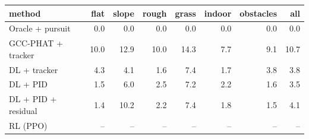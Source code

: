 \begin{tabular}{lrrrrrrr}
\toprule
method & flat & slope & rough & grass & indoor & obstacles & all\\
\midrule
Oracle + pursuit & 0.0 & 0.0 & 0.0 & 0.0 & 0.0 & 0.0 & 0.0 \\
GCC-PHAT + tracker & 10.0 & 12.9 & 10.0 & 14.3 & 7.7 & 9.1 & 10.7 \\
DL + tracker & 4.3 & 4.1 & 1.6 & 7.4 & 1.7 & 3.8 & 3.8 \\
DL + PID & 1.5 & 6.0 & 2.5 & 7.2 & 2.2 & 1.6 & 3.5 \\
DL + PID + residual & 1.4 & 10.2 & 2.2 & 7.4 & 1.8 & 1.5 & 4.1 \\
RL (PPO) & -- & -- & -- & -- & -- & -- & -- \\
\bottomrule
\end{tabular}
